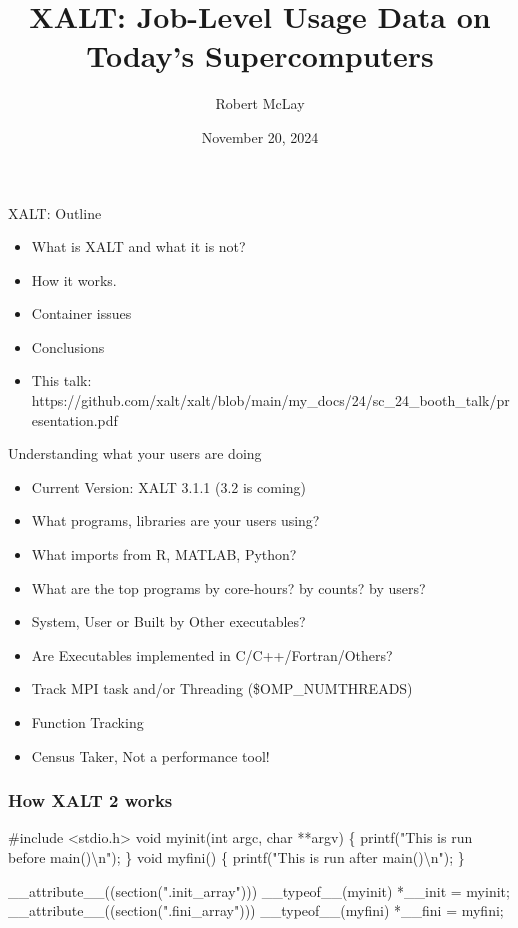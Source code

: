\documentclass{beamer}
\begin{document}
\title[XALT]{XALT: Job-Level Usage Data on Today's Supercomputers}
\author{Robert McLay}
\date{November 20, 2024}

\frame{\titlepage}

\begin{frame}{XALT: Outline}
  \begin{itemize}
    \item What is XALT and what it is not?
    \item How it works.
    \item Container issues
    \item Conclusions
    \item This talk: https://github.com/xalt/xalt/blob/main/my\_docs/24/sc\_24\_booth\_talk/presentation.pdf
  \end{itemize}
\end{frame}

\begin{frame}{Understanding what your users are doing}
  \begin{itemize}
    \item Current Version: XALT 3.1.1 (3.2 is coming)
    \item What programs, libraries are your users using?
    \item What imports from R, MATLAB, Python?
    \item What are the top programs by core-hours? by counts? by users?
    \item System, User or Built by Other executables?
    \item Are Executables implemented in C/C++/Fortran/Others?
    \item Track MPI task and/or Threading (\$OMP\_NUMTHREADS)
    \item Function Tracking
    \item Census Taker, Not a performance tool!
  \end{itemize}
\end{frame}

\begin{frame}[fragile]
    \frametitle{How XALT 2 works}
 {\tiny
    \begin{semiverbatim}
#include <stdio.h>
void myinit(int argc, char **argv)
\{ printf("This is run before main()\textbackslash{}n"); \}
void myfini()
\{ printf("This is run after main()\textbackslash{}n"); \}

__attribute__((section(".init_array"))) __typeof__(myinit) *__init = myinit;
__attribute__((section(".fini_array"))) __typeof__(myfini) *__fini = myfini;
    \end{semiverbatim}
}
\end{frame}
\end{document}
